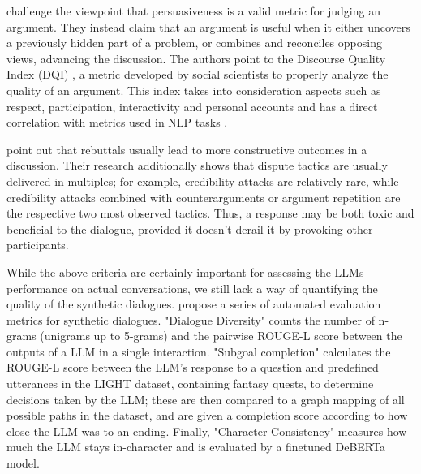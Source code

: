 \cite{vecchi-2021-towards} challenge the viewpoint that persuasiveness is a valid metric for judging an argument. They instead claim that an argument is useful when it either uncovers a previously hidden part of a problem, or combines and reconciles opposing views, advancing the discussion. The authors point to the Discourse Quality Index (DQI) \cite{Steiner2005-STEDPI-8, stab-gurevych-2017-parsing}, a metric developed by social scientists to properly analyze the quality of an argument. This index takes into consideration aspects such as respect, participation, interactivity and personal accounts and has a direct correlation with metrics used in NLP tasks \cite{wachsmuth-etal-2017-computational}. 

\cite{dekock2022disagree} point out that rebuttals usually lead to more constructive outcomes in a discussion. Their research additionally shows that dispute tactics are usually delivered in multiples; for example, credibility attacks are relatively rare, while credibility attacks combined with counterarguments or argument repetition are the respective two most observed tactics. Thus, a response may be both toxic and beneficial to the dialogue, provided it doesn't derail it by provoking other participants.

While the above criteria are certainly important for assessing the LLMs performance on actual conversations, we still lack a way of quantifying the quality of the synthetic dialogues. \cite{ulmer2024bootstrappingllmbasedtaskorienteddialogue} propose a series of automated evaluation metrics for synthetic dialogues. "Dialogue Diversity" counts the number of n-grams (unigrams up to 5-grams) and the pairwise ROUGE-L \cite{lin-2004-rouge} score between the outputs of a LLM in a single interaction. "Subgoal completion" calculates the ROUGE-L score between the LLM's response to a question and predefined utterances in the LIGHT \cite{urbanek-etal-2019-learning} dataset, containing fantasy quests, to determine decisions taken by the LLM; these are then compared to a graph mapping of all possible paths in the dataset, and are given a completion score according to how close the LLM was to an ending. Finally, "Character Consistency" measures how much the LLM stays in-character and is evaluated by a finetuned DeBERTa \cite{he2023debertav3improvingdebertausing} model.

